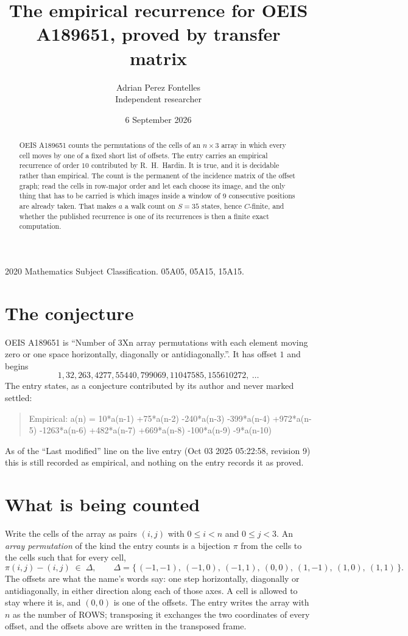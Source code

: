 \documentclass[11pt,a4paper]{article}
\title{The empirical recurrence for OEIS A189651, proved by transfer matrix}
\author{Adrian Perez Fontelles\\ \small Independent researcher}
\date{6 September 2026}
\theoremstyle{plain}
\theoremstyle{definition}
\begin{document}
\maketitle

\begin{abstract}
OEIS A189651 counts the permutations of the cells of an $n\times3$ array in which every cell
moves by one of a fixed short list of offsets. The entry carries an empirical recurrence of
order $10$ contributed by R.~H.~Hardin. It is true, and it is decidable rather than
empirical. The count is the permanent of the incidence matrix of the offset graph; read the
cells in row-major order and let each choose its image, and the only thing that has to be
carried is which images inside a window of $9$ consecutive positions are already taken.
That makes $a$ a walk count on $S=35$ states, hence $C$-finite, and whether the published
recurrence is one of its recurrences is then a finite exact computation.
\end{abstract}

\noindent\small 2020 Mathematics Subject Classification. 05A05, 05A15, 15A15.\normalsize

\section{The conjecture}

OEIS A189651 is ``Number of 3Xn array permutations with each element moving zero or one space horizontally, diagonally or antidiagonally.''. It has offset $1$ and begins
\[
1, 32, 263, 4277, 55440, 799069, 11047585, 155610272,\ \dots
\]
The entry states, as a conjecture contributed by its author and never marked settled:
\begin{quote}
Empirical: a(n) = 10*a(n-1) +75*a(n-2) -240*a(n-3) -399*a(n-4) +972*a(n-5) -1263*a(n-6) +482*a(n-7) +669*a(n-8) -100*a(n-9) -9*a(n-10)
\end{quote}
As of the ``Last modified'' line on the live entry (Oct 03 2025 05:22:58, revision 9) this is still
recorded as empirical, and nothing on the entry records it as proved.

\section{What is being counted}

Write the cells of the array as pairs $(i,j)$ with $0\le i<n$ and $0\le j<3$. An
\emph{array permutation} of the kind the entry counts is a bijection $\pi$ from the cells to
the cells such that for every cell,
\[
\pi(i,j)-(i,j)\;\in\;\Delta,\qquad
\Delta=\{\,(-1,-1),\ (-1,0),\ (-1,1),\ (0,0),\ (1,-1),\ (1,0),\ (1,1)\,\}.
\]
The offsets are what the name's words say: one step horizontally, diagonally or antidiagonally, in either direction along each of those axes. A cell is allowed to stay where it is, and $(0,0)$ is one of the offsets. The entry writes the array with $n$ as the number of ROWS; transposing it exchanges the two coordinates of every offset, and the offsets above are written in the transposed frame.
\end{document}
